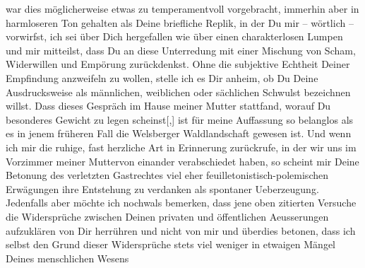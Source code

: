 \begin{ledgroupsized}[t]{13cm}
               war dies möglicherweise  etwas zu temperamentvoll
               vorgebracht, immerhin aber in harmloseren Ton gehalten als Deine briefliche Replik,
               in der Du mir – wörtlich – vorwirfst, ich sei über Dich hergefallen wie über einen
               charakterlosen Lumpen und mir mitteilst, dass Du an diese Unterredung mit einer
               Mischung von Scham, Widerwillen und Empörung zurückdenkst. Ohne die subjektive
               Echtheit Deiner Empfindung anzweifeln zu wollen, stelle ich es Dir anheim, ob Du
               Deine Ausdrucksweise als männlichen, weiblichen oder sächlichen Schwulst bezeichnen
               willst. {\pb}Dass dieses Gespräch im Hause
               meiner Mutter stattfand,
               worauf Du besonderes Gewicht zu legen scheinst{[},{]} ist für meine
               Auffassung so belanglos als es in jenem früheren Fall die Welsberger Waldlandschaft gewesen ist. Und wenn ich mir die
               ruhige, fast herzliche Art in Erinnerung zurückrufe, in der wir uns im Vorzimmer
               meiner Mutter\introOben{}von einander\introOben{} verabschiedet haben, so scheint mir Deine
               Betonung des verletzten Gastrechtes viel eher feuilletoni\introOben{}sti\introOben{}sch-polemischen Erwägungen ihre Entstehung zu verdanken als spontaner
               Ueberzeugung. Jedenfalls aber möchte ich nochwals bemerken, dass jene oben zitierten
               Versuche die Widersprüche zwischen Deinen privaten und öffentlichen Aeusserungen aufzuklären von
               Dir herrühren und nicht von mir und überdies betonen, dass ich selbst den Grund
               dieser Widersprüche stets viel weniger in etwaigen Mängel Deines menschlichen Wesens

\end{ledgroupsized}
